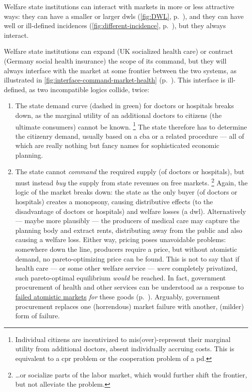 Welfare state institutions can interact with markets in more or less attractive ways:
they can have a smaller or larger \glspl{dwl} (\autoref{fig:DWL}, p.~\pageref{fig:DWL}), and they can have well or ill-defined incidences (\autoref{fig:different-incidence}, p.~\pageref{fig:different-incidence}), but they always interact.%

Welfare state institutions can expand (UK socialized health care) or contract (Germany social health insurance) the scope of its command, but they will always interface with the market at some frontier between the two systems, as illustrated in \autoref{fig:interface-command-market-health} (p.~\pageref{fig:interface-command-market-health}).
This interface is ill-defined, as two incompatible logics collide, twice:

\begin{enumerate}
	\item The state demand curve (dashed in green) for doctors or hospitals breaks down, as the marginal utility of an additional doctors to citizens (the ultimate consumers) cannot be known.
	\footnote{
		Individual citizens are incentivized to mis(over)-represent their marginal utility from additional doctors, absent individually accruing costs.
		This is equivalent to a \gls{cpr} problem or the cooperation problem of a \gls{pd}.
	}
	The state therefore has to determine the citizenry demand, usually based on a \gls{cba} or a related procedure --- all of which are really nothing but fancy names for sophisticated economic planning.

	\item The state cannot \emph{command} the required supply (of doctors or hospitals), but must instead \emph{buy} the supply from state revenues on free markets.
	\footnote{
		\ldots or socialize parts of the labor market, which would further shift the frontier, but not alleviate the problem.
	}
	Again, the logic of the market breaks down:
	the state as the only buyer (of doctors or hospitals) creates a monopsony, causing distributive effects (to the disadvantage of doctors or hospitals) and welfare losses (a \gls{dwl}).
	Alternatively --- maybe more plausibly --- the producers of medical care may capture the planning body and extract rents, distributing away from the public and also causing a welfare loss.
	Either way, pricing poses unavoidable problems:
	somewhere down the line, producers require a price, but without atomistic demand, no pareto-optimizing price can be found.
	This is not to say that if health care --- or some other welfare service --- \emph{were} completely privatized, such pareto-optimal equilibrium \emph{would} be reached.
	In fact, government procurement of health and other services can be understood as a response to \hyperref[sec:market-failures]{failed atomistic markets} \emph{for} these goods (p.~\pageref{sec:market-failures}).
	Arguably, government procurement replaces one (horrendous) market failure with another, (milder) form of failure.
\end{enumerate}


